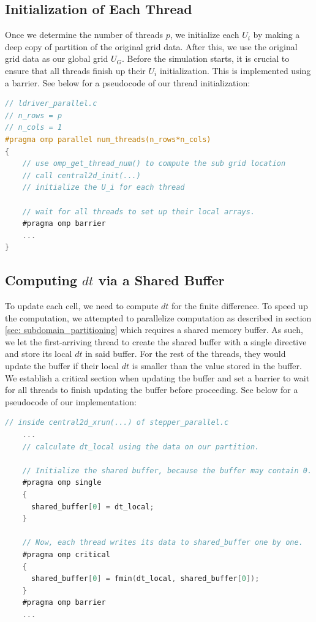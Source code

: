 \documentclass{article}
\begin{document}
\subsection{Initialization of Each Thread}
Once we determine the number of threads $p$, we initialize each $U_i$ by making a deep copy of partition of the original grid data. 
After this, we use the original grid data as our global grid $U_G$. Before the simulation starts, it is crucial to ensure that all threads finish up their $U_i$ initialization.
This is implemented using a barrier. See below for a pseudocode of our thread initialization: 

\begin{lstlisting}[language=C]
// ldriver_parallel.c
// n_rows = p
// n_cols = 1
#pragma omp parallel num_threads(n_rows*n_cols)
{
    // use omp_get_thread_num() to compute the sub grid location
    // call central2d_init(...)
    // initialize the U_i for each thread

    // wait for all threads to set up their local arrays.
    #pragma omp barrier
    ...
}
\end{lstlisting}

\subsection{Computing $dt$ via a Shared Buffer}
To update each cell, we need to compute $dt$ for the finite difference. To speed up the computation, 
we attempted to parallelize computation as described in section \ref{sec: subdomain_partitioning} which requires a shared 
memory buffer. As such, we let the first-arriving thread to create the shared buffer with a single directive 
and store its local $dt$ in said buffer. For the rest of the threads, they would update the buffer if their local $dt$ is smaller than
the value stored in the buffer.  We establish a critical section when updating the buffer and set a barrier to wait for all threads 
to finish updating the buffer before proceeding. See below for a pseudocode of our implementation: 

\begin{lstlisting}[language=C]
// inside central2d_xrun(...) of stepper_parallel.c
    ...
    // calculate dt_local using the data on our partition.

    // Initialize the shared buffer, because the buffer may contain 0.
    #pragma omp single
    {
      shared_buffer[0] = dt_local;
    }

    // Now, each thread writes its data to shared_buffer one by one.
    #pragma omp critical
    {
      shared_buffer[0] = fmin(dt_local, shared_buffer[0]);
    }
    #pragma omp barrier
    ...
\end{lstlisting}
\end{document}
